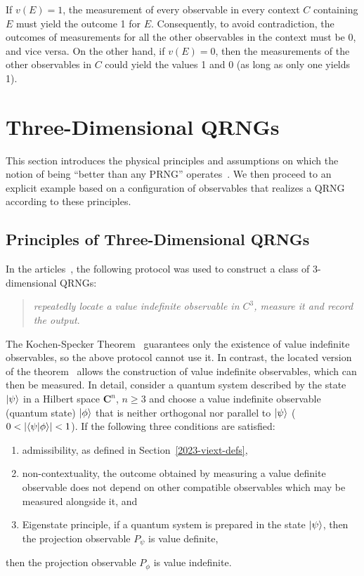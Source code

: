 \documentclass[%
 superscriptaddress,
  preprint,
 showpacs,
 showkeys,
 nofootinbib,
  amsmath,amssymb,
  aps,
 pra,
  longbibliography,
  floatfix,
 ]{revtex4-2}
\theoremstyle{definition}
\begin{document}
If $v(E)=1$, the measurement of every observable in
every
context $C$ containing $E$ must yield the outcome 1 for $E$.
Consequently, to avoid contradiction, the outcomes of measurements for all the other observables in the context must be 0, and vice versa.  On the other hand, if $v(E)=0$,
then the measurements of the other observables in $C$ could yield the values 1 and 0 (as long as only one yields 1).


\section{Three-Dimensional QRNGs}

This section introduces the physical principles and assumptions on which the notion of being ``better than any PRNG'' operates~\cite{2012-incomput-proofsCJ,aguero_trejo_new_2021,RSPA23}.
We then proceed to an explicit example based on a configuration of observables that realizes a QRNG according to these principles.


\subsection{Principles of Three-Dimensional QRNGs}


In the articles~\cite{2008-cal-svo,2012-incomput-proofsCJ,2015-AnalyticKS}, the following protocol was used to construct a class of  3-dimensional QRNGs:
\begin{quote} {\it repeatedly locate a value indefinite observable in $C^3$, measure it and record the output}.
\end{quote}
 The Kochen-Specker Theorem~\cite{kochen1} guarantees only the existence of value indefinite
observables, so the above protocol cannot use it. In contrast, the located version of the theorem~\cite{2008-cal-svo,2012-incomput-proofsCJ} allows the construction of value indefinite observables, which can then be measured. In detail, consider a quantum system
 described by the state
$\ket{\psi}$ in a Hilbert space ${\mathbf C}^n$, $n\ge 3$ and choose  a value indefinite observable (quantum state) $\ket{\phi}$ that is neither orthogonal nor parallel to $\ket{\psi}$ {\rm ($0<\abs{\bra{\psi}\ket{\phi}}<1$)}. If the following three conditions are satisfied:

\begin{enumerate}
\item  admissibility, as defined in Section~\ref{2023-viext-defs}, \item non-contextuality,
the outcome obtained by
measuring a value definite observable
  does not
depend on other compatible
 observables which may be measured alongside it, and \item
Eigenstate principle, if a quantum system is prepared in the
state $\ket{\psi}$,
then the projection observable
$P_\psi$ is value definite,
\end{enumerate}
then the projection observable $P_\phi$ is value indefinite.
\end{document}
